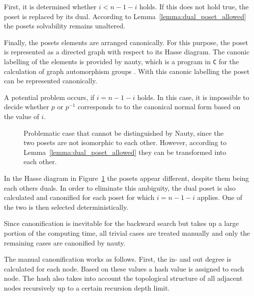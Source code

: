 \documentclass[10pt,journal,compsoc]{IEEEtran}
\begin{document}
First, it is determined whether $i < n - 1 - i$ holds.
If this does not hold true, the poset is replaced by its dual.
According to Lemma~\ref{lemma:dual_poset_allowed} the posets solvability remains unaltered.

Finally, the posets elements are arranged canonically.
For this purpose, the poset is represented as a directed graph with respect to its Hasse diagram.
The canonic labelling of the elements is provided by nauty, which is a program in \texttt{C} for the calculation of graph automorphism groups \cite[Practical Graph Isomorphism]{MCKAY201494}.
With this canonic labelling the poset can be represented canonically.

A potential problem occurs, if $i = n - 1 - i$ holds.
In this case, it is impossible to decide whether $p$ or $p^{-1}$ corresponds to to the canonical normal form based on the value of $i$.

\begin{figure}
  
  \centering
  \caption{Problematic case that cannot be distinguished by Nauty, since the two posets are not isomorphic to each other. However, according to Lemma~\ref{lemma:dual_poset_allowed} they can be transformed into each other.}
  \label{fig:backward_canonify_problematic}
\end{figure}

In the Hasse diagram in Figure~\ref{fig:backward_canonify_problematic} the posets appear different, despite them being each others duals.
In order to eliminate this ambiguity, the dual poset is also calculated and canonified for each poset for which $i = n - 1 - i$ applies.
One of the two is then selected deterministically.

Since canonification is inevitable for the backward search but takes up a large portion of the computing time, all trivial cases are treated manually and only the remaining cases are canonified by nauty.

The manual canonification works as follows.
First, the in- and out degree is calculated for each node.
Based on these values a hash value is assigned to each node.
The hash also takes into account the topological structure of all adjacent nodes recursively up to a certain recursion depth limit.
\end{document}

